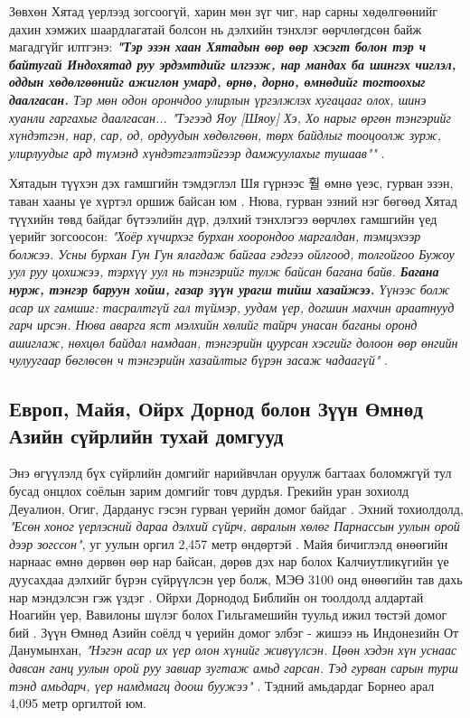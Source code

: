 \documentclass[10pt,twocolumn,letterpaper]{article}
\begin{document}
Зөвхөн Хятад үерлээд зогсоогүй, харин мөн зүг чиг, нар сарны хөдөлгөөнийг дахин хэмжих шаардлагатай болсон нь дэлхийн тэнхлэг өөрчлөгдсөн байж магадгүйг илтгэнэ: \textit{\textbf{"Тэр эзэн хаан Хятадын өөр өөр хэсэгт болон тэр ч байтугай Индохятад руу эрдэмтдийг илгээж, нар мандах ба шингэх чиглэл, оддын хөдөлгөөнийг ажиглон умард, өрнө, дорно, өмнөдийг тогтоохыг даалгасан.} Тэр мөн одон орончдоо улирлын үргэлжлэх хугацааг олох, шинэ хуанли гаргахыг даалгасан... "Тэгээд Яоу [Шяоу] Хэ, Хо нарыг өргөн тэнгэрийг хүндэтгэн, нар, сар, од, ордуудын хөдөлгөөн, төрх байдлыг тооцоолж зурж, улирлуудыг ард түмэнд хүндэтгэлтэйгээр дамжуулахыг тушаав""} \cite{5}.

Хятадын түүхэн дэх гамшгийн тэмдэглэл Шя гүрнээс 훨 өмнө үеэс, гурван эзэн, таван хааны үе хүртэл оршиж байсан юм \cite{7}. Нюва, гурван эзний нэг бөгөөд Хятад түүхийн төвд байдаг бүтээлийн дүр, дэлхий тэнхлэгээ өөрчлөх гамшгийн үед үерийг зогсоосон: \textit{"Хоёр хүчирхэг бурхан хоорондоо маргалдан, тэмцэхээр болжээ. Усны бурхан Гун Гун ялагдаж байгаа гэдгээ ойлгоод, толгойгоо Бужоу уул руу цохижээ, тэрхүү уул нь тэнгэрийг тулж байсан багана байв. \textbf{Багана нурж, тэнгэр баруун хойш, газар зүүн урагш тийш хазайжээ.} Үүнээс болж асар их гамшиг: тасралтгүй гал түймэр, уудам үер, догшин махчин араатнууд гарч ирсэн. Нюва аварга яст мэлхийн хөлийг тайрч унасан баганы оронд ашиглаж, нөхцөл байдал намдаан, тэнгэрийн цуурсан хэсгийг долоон өөр өнгийн чулуугаар бөглөсөн ч тэнгэрийн хазайлтыг бүрэн засаж чадаагүй"} \cite{8}.

\subsection{Европ, Майя, Ойрх Дорнод болон Зүүн Өмнөд Азийн сүйрлийн тухай домгууд}

Энэ өгүүлэлд бүх сүйрлийн домгийг нарийвчлан оруулж багтаах боломжгүй тул бусад онцлох соёлын зарим домгийг товч дурдъя. Грекийн уран зохиолд Деуалион, Огиг, Дарданус гэсэн гурван үерийн домог байдаг \cite{9,10}. Эхний тохиолдолд, \textit{"Есөн хоног үерлэсний дараа дэлхий сүйрч, авралын хөлөг Парнассын уулын орой дээр зогссон"}, уг уулын оргил 2,457 метр өндөртэй \cite{11}. Майя бичиглэлд өнөөгийн нарнаас өмнө дөрвөн өөр нар байсан, дөрөв дэх нар болох Калчиутликүгийн үе дуусахдаа дэлхийг бүрэн сүйрүүлсэн үер болж, МЭӨ 3100 онд өнөөгийн тав дахь нар мэндэлсэн гэж үздэг \cite{12}. Ойрхи Дорнодод Библийн он тоолдолд алдартай Ноагийн үер, Вавилоны шүлэг болох Гильгамешийн туульд ижил төстэй домог бий \cite{13}. Зүүн Өмнөд Азийн соёлд ч үерийн домог элбэг - жишээ нь Индонезийн От Данумынхан, \textit{"Нэгэн асар их үер олон хүнийг живүүлсэн. Цөөн хэдэн хүн уснаас давсан ганц уулын орой руу завиар зугтаж амьд гарсан. Тэд гурван сарын турш тэнд амьдарч, үер намдмагц доош буужээ"} \cite{3}. Тэдний амьдардаг Борнео арал 4,095 метр оргилтой юм.
\end{document}
